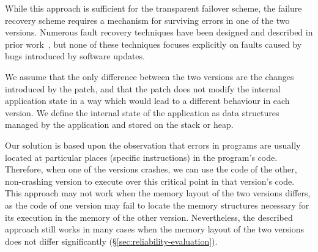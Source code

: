 While this approach is sufficient for the transparent failover scheme, the
failure recovery scheme requires a mechanism for surviving errors in one of the
two versions. Numerous fault recovery techniques have been designed and
described in prior
work~\cite{rx,compl-schedules11,fo,exec-trans06,vigilante,clearview,microreboots,shepherding:pldi14},
but none of these techniques focuses explicitly on faults caused by bugs
introduced by software updates.

We assume that the only difference between the two versions are the changes
introduced by the patch, and that the patch does not modify the internal
application state in a way which would lead to a different behaviour in each
version. We define the internal state of the application as data
structures managed by the application and stored on the stack or heap.

Our solution is based upon the observation that errors in programs are usually
located at particular places (\ie specific instructions) in the program's code.
Therefore, when one of the versions crashes, we can use the code of the other,
non-crashing version to execute over this critical point in that version's
code. This approach may not work when the memory layout of the two versions
differs, as the code of one version may fail to locate the memory structures
necessary for its execution in the memory of the other version.  Nevertheless,
the described approach still works in many cases when the memory layout of the
two versions does not differ significantly
(\S\ref{sec:reliability-evaluation}).

 
